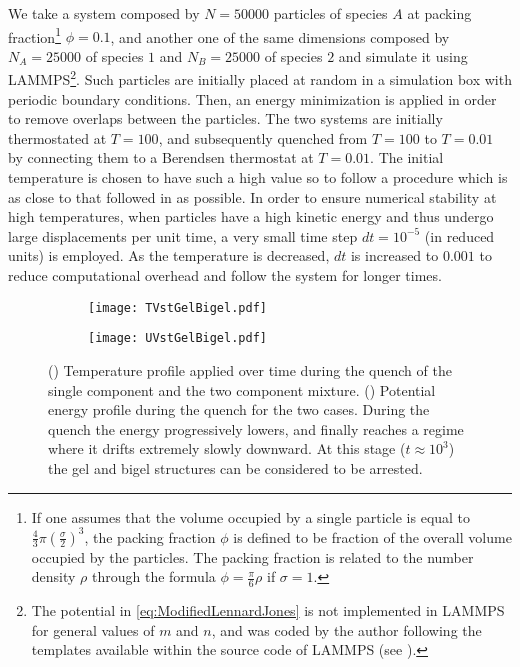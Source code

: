 We take a system composed by $N = 50000$ particles of species $A$ at packing fraction\footnote{If one assumes that the volume occupied by a single particle is equal to $\frac{4}{3} \pi \left(\frac{\sigma}{2}\right)^{3}$, the packing fraction $\phi$ is defined to be fraction of the overall volume occupied by the particles. The packing fraction is related to the number density $\rho$ through the formula $\phi = \frac{\pi}{6} \rho$ if $\sigma = 1$.} $\phi = 0.1$, and another one of the same dimensions composed by $N_{A} = 25000$ of species $1$ and $N_{B} = 25000$ of species $2$ and simulate it using LAMMPS\footnote{The potential in \autoref{eq:ModifiedLennardJones} is not implemented in LAMMPS for general values of $m$ and $n$, and was coded by the author following the templates available within the source code of LAMMPS (see \cite{mygithub}).}. Such particles are initially placed at random in a simulation box with periodic boundary conditions. Then, an energy minimization is applied in order to remove overlaps between the particles. 
The two systems are initially thermostated at $T=100$, and subsequently quenched from $T=100$ to $T=0.01$ by connecting them to a Berendsen \cite{hunenberger2005thermostat} thermostat at $T=0.01$. The initial temperature is chosen to have such a high value so to follow a procedure which is as close to that followed in \cite{varrato2012arrested} as possible. In order to ensure numerical stability at high temperatures, when particles have a high kinetic energy and thus undergo large displacements per unit time, a very small time step $dt = 10^{-5}$ (in reduced units) is employed. As the temperature is decreased, $dt$ is increased to $0.001$ to reduce computational overhead and follow the system for longer times.

\begin{figure}
	\centering
	\begin{subfigure}[b]{0.5\textheight}
		\centering
		\texttt{[image: TVstGelBigel.pdf]}
		\caption{\label{fig:TVstGelBigel}}	
	\end{subfigure}
	\begin{subfigure}[b]{0.5\textheight}
		\centering
		\texttt{[image: UVstGelBigel.pdf]}
		\caption{\label{fig:UVstGelBigel}}
	\end{subfigure}	
	\caption{() Temperature profile applied over time during the quench of the single component and the two component mixture. () Potential energy profile during the quench for the two cases. During the quench the energy progressively lowers, and finally reaches a regime where it drifts extremely slowly downward. At this stage ($t \approx 10^{3}$) the gel and bigel structures can be considered to be arrested. \label{fig:QuenchGelBigel}}
\end{figure}

